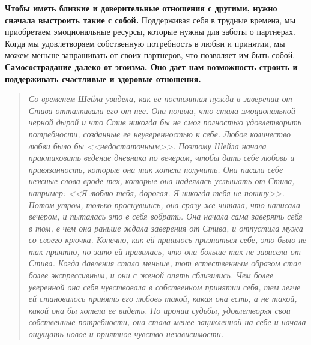 \textbf{Чтобы иметь близкие и доверительные отношения с другими, нужно сначала выстроить такие с собой.} Поддерживая себя в трудные времена, мы приобретаем эмоциональные ресурсы, которые нужны для заботы о партнерах. Когда мы удовлетворяем собственную потребность в любви и принятии, мы можем  меньше запрашивать от своих партнеров, что позволяет им быть собой. \textbf{Самосострадание далеко от эгоизма. Оно дает нам возможность строить и поддерживать счастливые и здоровые отношения.} 

\begin{quotation}
	\textit{
		Со временем Шейла увидела, как ее постоянная нужда в заверении от Стива отталкивала его от нее. Она поняла, что стала эмоциональной черной дырой и что Стив никогда бы не смог полностью удовлетворить потребности, созданные ее неуверенностью к себе. Любое количество любви было бы <<недостаточным>>. Поэтому Шейла начала практиковать ведение дневника по вечерам, чтобы дать себе любовь и привязанность, которые она так хотела получить.  Она писала себе нежные слова вроде тех, которые она надеялась услышать от Стива, например: <<Я люблю тебя, дорогая. Я никогда тебя не покину>>. Потом утром, только проснувшись, она сразу же читала, что написала вечером, и пыталась это в себя вобрать. Она начала сама заверять себя в том, в чем она раньше ждала заверения от Стива, и отпустила мужа со своего крючка. Конечно, как ей пришлось признаться себе, это было не так приятно, но зато ей нравилась, что она больше так не зависела от Стива. Когда давления стало меньше, тот естественным образом стал более экспрессивным, и они с женой опять сблизились. Чем более уверенной она себя чувствовала в собственном принятии себя, тем легче ей становилось принять его любовь такой, какая она есть, а не такой, какой она бы хотела ее видеть. По иронии судьбы, удовлетворяя свои собственные потребности, она стала менее зацикленной на себе и начала ощущать новое и приятное чувство независимости.
	}
\end{quotation}

\newpage
{} \label{IP:Self-Compassion_Break_in_Relationship_Conflicts}

